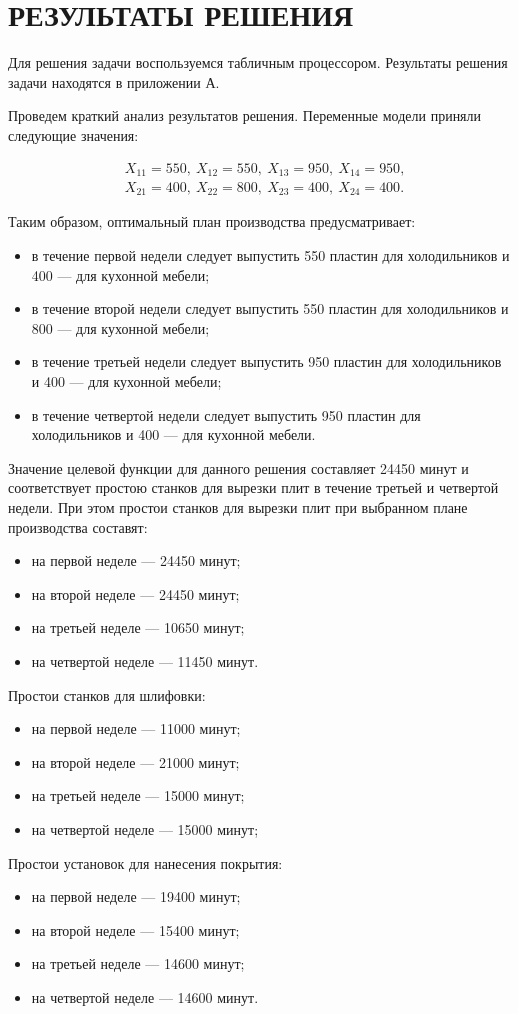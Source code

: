 \section{РЕЗУЛЬТАТЫ РЕШЕНИЯ}

Для решения задачи воспользуемся табличным процессором.
Результаты решения задачи находятся в приложении А.

Проведем краткий анализ результатов решения.
Переменные модели приняли следующие значения:
\begin{small}
  \begin{align*}
    & X_{11} = 550, \: X_{12} = 550, \: X_{13} = 950, \: X_{14} = 950, \\
    & X_{21} = 400, \: X_{22} = 800, \: X_{23} = 400, \: X_{24} = 400.
  \end{align*}
\end{small}

\vspace{-7mm}

Таким образом, оптимальный план производства предусматривает:
\begin{itemize}
\item в течение первой недели следует выпустить 
  550 пластин для холодильников и 400 --- для кухонной мебели;
\item в течение второй недели следует выпустить 
  550 пластин для холодильников и 800 --- для кухонной мебели;
\item в течение третьей недели следует выпустить 
  950 пластин для холодильников и 400 --- для кухонной мебели;
\item в течение четвертой недели следует выпустить 
  950 пластин для холодильников и 400 --- для кухонной мебели.
\end{itemize}

Значение целевой функции для данного решения составляет 24450 минут и
соответствует простою станков для вырезки плит в течение третьей и четвертой недели.
При этом простои станков для вырезки плит при выбранном плане производства составят:
\begin{itemize}
\item на первой неделе --- 24450 минут;
\item на второй неделе --- 24450 минут;
\item на третьей неделе --- 10650 минут;
\item на четвертой неделе --- 11450 минут.
\end{itemize}

Простои станков для шлифовки:
\begin{itemize}
\item на первой неделе --- 11000 минут;
\item на второй неделе --- 21000 минут;
\item на третьей неделе --- 15000 минут;
\item на четвертой неделе --- 15000 минут;
\end{itemize}

Простои установок для нанесения покрытия:
\begin{itemize}
\item на первой неделе --- 19400 минут;
\item на второй неделе --- 15400 минут;
\item на третьей неделе --- 14600 минут;
\item на четвертой неделе --- 14600 минут.
\end{itemize}

\newpage
